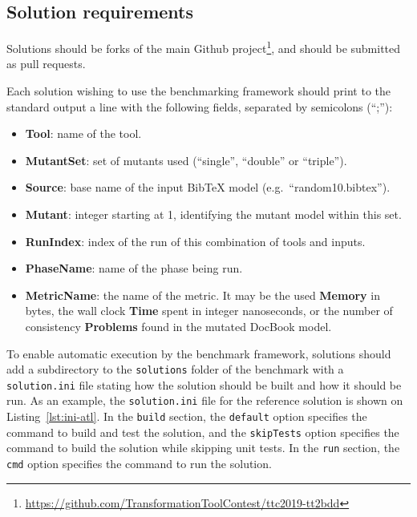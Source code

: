\documentclass[a4paper]{scrartcl}
\newcommand*{\file}[1]{\texttt{#1}}
\begin{document}
\subsection{Solution requirements}
\label{sec:solut-requ}

Solutions should be forks of the main Github
project\footnote{\url{https://github.com/TransformationToolContest/ttc2019-tt2bdd}},
and should be submitted as pull requests.

Each solution wishing to use the benchmarking framework should print to the
standard output a line with the following fields, separated by semicolons
(``;''):

\begin{itemize}
\item \textbf{Tool}: name of the tool.
\item \textbf{MutantSet}: set of mutants used (``single'', ``double'' or ``triple'').
\item \textbf{Source}: base name of the input BibTeX model (e.g.\ ``random10.bibtex'').
\item \textbf{Mutant}: integer starting at 1, identifying the mutant model within this set.
\item \textbf{RunIndex}: index of the run of this combination of tools and inputs.
\item \textbf{PhaseName}: name of the phase being run.
\item \textbf{MetricName}: the name of the metric. It may be the used
  \textbf{Memory} in bytes, the wall clock \textbf{Time} spent in integer
  nanoseconds, or the number of consistency \textbf{Problems} found in the
  mutated DocBook model.
\end{itemize}



To enable automatic execution by the benchmark framework, solutions should add a
subdirectory to the \file{solutions} folder of the benchmark with a
\file{solution.ini} file stating how the solution should be built and how it
should be run. As an example, the \file{solution.ini} file for the reference
solution is shown on Listing~\ref{lst:ini-atl}. In the \file{build} section, the
\file{default} option specifies the command to build and test the solution, and
the \file{skipTests} option specifies the command to build the solution while
skipping unit tests. In the \file{run} section, the \file{cmd} option specifies
the command to run the solution.
\end{document}
